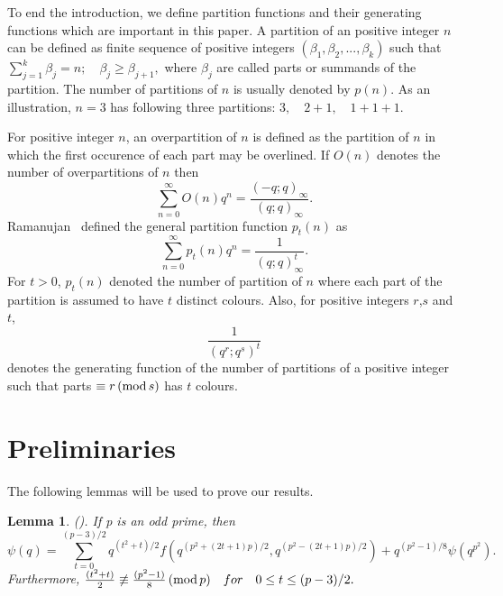 \documentclass[12pt]{article}
\renewcommand{\(}{\left\(}
\renewcommand{\)}{\right\)}
\renewcommand{\[}{\left[}
\renewcommand{\]}{\right]}
\renewcommand{\pmod}[1]{\,(\textup{mod}\,#1)}
\numberwithin{equation}{section}
\theoremstyle{plain}
\newtheorem{lemma}[theorem]{Lemma}
\begin{document}
		To end the introduction, we define partition functions and their generating functions which are important in this paper.
		A partition of an positive integer $n$ can be defined as finite sequence of positive integers $(\beta_1, \beta_2, ..., \beta_k)$ such that $\sum_{j=1}^k\beta_j=n;\quad \beta_j\ge \beta_{j+1},$ where $\beta_j$ are called parts or summands of the partition. The number of partitions of $n$ is usually denoted by $p(n)$. As an illustration, $n=3$ has following three partitions: $3,\quad  2+1, \quad1+1+1.$
		
		For positive integer $n$, an overpartition of  $n$ is defined as the partition of $n$ in which the first occurence of each part may be overlined. If $O(n)$ denotes the number of overpartitions of $n$ then $$\sum_{n=0}^{\infty}O(n)q^n=\dfrac{(-q;q)_\infty}{(q;q)_\infty}.$$
		Ramanujan~\cite{BR} defined the general partition function $p_{t}(n)$ as
		$$\sum_{n = 0}^{\infty}p_{t}(n)q^n = \frac{1}{(q;q)_{\infty}^t}.$$
		For $t>0$,  $p_{t}(n)$ denoted the number of partition of $n$ where each part of the partition is assumed to have $t$ distinct colours.  Also, for positive integers $r$,$s$ and $t$, $$\dfrac{1}{(q^r;q^s)^t}$$ denotes the generating function of the number of partitions of a positive integer such that parts $\equiv r\pmod{s}$ has $t$ colours. 
		\section{Preliminaries}
		The following  lemmas will be used to prove our results. 
		
		\begin{lemma} (\cite[Theorem 2.1]{CG}). If p is an odd prime, then
		\begin{equation}\label{eq7}
		\psi(q) = \sum_{t=0}^{(p-3)/2} q^{(t^{2}+t)/2} f\left(q^{\left(p^{2}+(2t+1)p\right)/2}, q^{\left(p^{2}-(2t+1)p\right)/2}\right) + q^{(p^{2}-1)/8}\psi(q^{p^2}).
		\end{equation}
		Furthermore, $\frac{(t^{2}+t)}{2} \not\equiv \frac{(p^{2}-1)}{8} \pmod{p}\quad for\quad 0\leq t \leq (p-3)/2.$
		\end{lemma}
		
\end{document}
